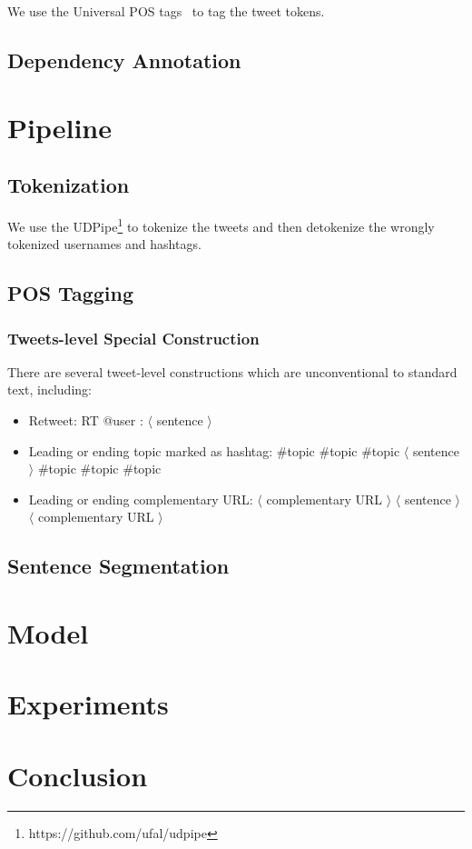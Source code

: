 \documentclass[11pt,letterpaper]{article}
\begin{document}
We use the Universal POS tags~\cite{PETROV12.274} to tag the tweet tokens.


\subsection{Dependency Annotation}


\section{Pipeline}
\subsection{Tokenization}
We use the UDPipe\footnote{https://github.com/ufal/udpipe} to tokenize the tweets and then detokenize the wrongly tokenized usernames and hashtags.

\subsection{POS Tagging}



\subsubsection{Tweets-level Special Construction}
There are several tweet-level constructions which are unconventional to standard text, including:

\begin{itemize}
\item Retweet: RT @user : $\langle$ sentence $\rangle$
\item Leading or ending topic marked as hashtag: \#topic \#topic \#topic $\langle$ sentence $\rangle$ \#topic \#topic \#topic
\item Leading or ending complementary URL:  $\langle$ complementary URL $\rangle$ $\langle$ sentence $\rangle$ $\langle$ complementary URL $\rangle$
\end{itemize}


\subsection{Sentence Segmentation}

\section{Model}

\section{Experiments}

\section{Conclusion}





\end{document}
